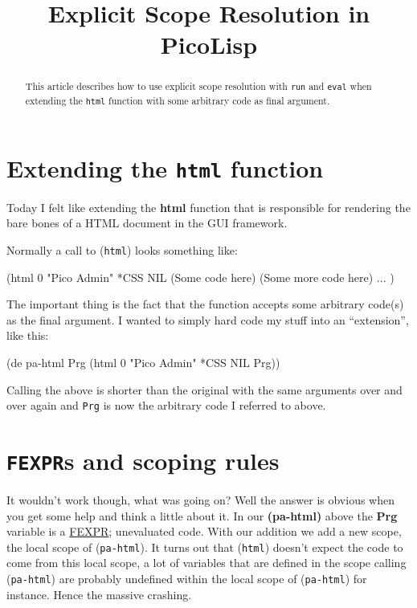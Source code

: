 \title{Explicit Scope Resolution in PicoLisp}

\maketitle

\begin{abstract}
  This article describes how to use explicit scope resolution with
  \texttt{run} and \texttt{eval} when extending the \texttt{html}
  function with some arbitrary code as final argument. 
\end{abstract}

\section{Extending the \texttt{html} function}
\label{sec:expl-scope-res-extending-the-html}

Today I felt like extending the \textbf{html} function that is responsible for
rendering the bare bones of a HTML document in the GUI framework.

Normally a call to (\texttt{html}) looks something like:

\begin{wideverbatim}
(html 0 "Pico Admin" *CSS NIL
  (Some code here)
  (Some more code here) ... )
\end{wideverbatim}

The important thing is the fact that the function accepts some arbitrary
code(s) as the final argument. I wanted to simply hard code my stuff
into an ``extension'', like this:


\begin{wideverbatim}
(de pa-html Prg
  (html 0 "Pico Admin" *CSS NIL Prg))
\end{wideverbatim}

Calling the above is shorter than the original with the same arguments
over and over again and \texttt{Prg} is now the arbitrary code I
referred to above.

\section{ \texttt{FEXPR}s and scoping rules}
\label{sec:expl-scope-res-fexpr}


It wouldn't work though, what was going on? Well the answer is obvious
when you get some help and think a little about it. In our
\textbf{(pa-html)} above the \textbf{Prg} variable is a
\href{http://en.wikipedia.org/wiki/Fexpr}{FEXPR}; unevaluated code.
With our addition we add a new scope, the local scope of
(\texttt{pa-html}). It turns out that (\texttt{html}) doesn't expect
the code to come from this local scope, a lot of variables that are
defined in the scope calling (\texttt{pa-html}) are probably undefined
within the local scope of (\texttt{pa-html}) for instance. Hence the
massive crashing.

